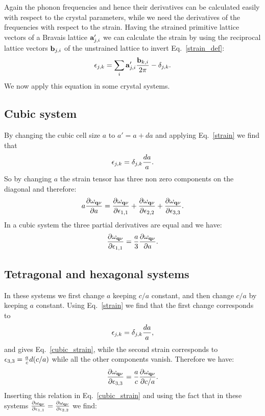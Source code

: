 \documentclass[12pt,a4paper]{article}
\begin{document}
Again the phonon frequencies and hence their derivatives can be calculated 
easily with respect to the crystal parameters, while we need the derivatives 
of the frequencies with respect to the strain. 
Having the strained primitive lattice vectors of a Bravais lattice 
${\bf a}'_{j,i}$ we can calculate the strain by using the reciprocal 
lattice vectors ${\bf b}_{j,i}$ of the unstrained lattice to invert
Eq.~\ref{strain_def}:
\begin{equation}
\epsilon_{j,k} = \sum_i {\bf a}'_{j,i} {{\bf b}_{k,i} \over 2 \pi} -
\delta_{j,k}.
\label{strain}
\end{equation}
We now apply this equation in some crystal systems.

\subsection{\color{web-blue}Cubic system}
By changing the cubic cell size $a$ to $a'=a+da$ and applying Eq.~\ref{strain}
we find that
\begin{equation}
\epsilon_{j,k}=\delta_{j,k} {da \over a}.
\end{equation}
So by changing $a$ the strain tensor has three non zero components on the
diagonal and therefore:
\begin{equation}
a {\partial \omega_{{\bf q}\nu} \over \partial a} = 
{\partial \omega_{{\bf q}\nu} \over \partial 
\epsilon_{1,1}} + {\partial  \omega_{{\bf q}\nu} \over \partial 
\epsilon_{2,2}} + {\partial  \omega_{{\bf q}\nu} \over \partial 
\epsilon_{3,3}}.
\label{cubic_strain}
\end{equation}
In a cubic system the three partial derivatives 
are equal and we have:
\begin{equation}
{\partial \omega_{{\bf q}\nu} 
\over \partial \epsilon_{1,1}} = {a \over 3} {\partial
 \omega_{{\bf q}\nu} \over \partial a}.
\end{equation}
%
\subsection{\color{web-blue}Tetragonal and hexagonal systems}
In these systems we first change $a$ keeping $c/a$ constant, and then
change $c/a$ by keeping $a$ constant. Using Eq.~\ref{strain} we find that
the first change corresponds to
\begin{equation}
\epsilon_{j,k}=\delta_{j,k} {da \over a},
\end{equation}
and gives Eq.~\ref{cubic_strain}, while the second strain corresponds
to $\epsilon_{3,3}= {a \over c} d (c/a) $ while all the other
components vanish. Therefore we have:
\begin{equation}
{\partial \omega_{{\bf q}\nu} 
\over \partial \epsilon_{3,3}} = {a \over c} {\partial \omega_{{\bf q}\nu} 
\over \partial c/a}.
\end{equation}
Inserting this relation in Eq.~\ref{cubic_strain} and using the fact that
in these systems 
${\partial \omega_{{\bf q}\nu} \over \partial \epsilon_{1,1}}=
{\partial \omega_{{\bf q}\nu} \over \partial \epsilon_{2,2}}$ we find:
\end{document}
